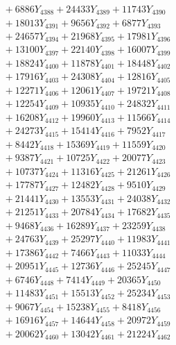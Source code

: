\documentclass[a4paper,10pt]{article}
\begin{document}
{\begin{align}
&\;  + 6886 Y_{4388} + 24433 Y_{4389} + 11743 Y_{4390} \\[0.3ex]
&\;  + 18013 Y_{4391} + 9656 Y_{4392} + 6877 Y_{4393} \\[0.3ex]
&\;  + 24657 Y_{4394} + 21968 Y_{4395} + 17981 Y_{4396} \\[0.3ex]
&\;  + 13100 Y_{4397} + 22140 Y_{4398} + 16007 Y_{4399} \\[0.3ex]
&\;  + 18824 Y_{4400} + 11878 Y_{4401} + 18448 Y_{4402} \\[0.3ex]
&\;  + 17916 Y_{4403} + 24308 Y_{4404} + 12816 Y_{4405} \\[0.3ex]
&\;  + 12271 Y_{4406} + 12061 Y_{4407} + 19721 Y_{4408} \\[0.5ex]\allowbreak
&\;  + 12254 Y_{4409} + 10935 Y_{4410} + 24832 Y_{4411} \\[0.3ex]
&\;  + 16208 Y_{4412} + 19960 Y_{4413} + 11566 Y_{4414} \\[0.3ex]
&\;  + 24273 Y_{4415} + 15414 Y_{4416} + 7952 Y_{4417} \\[0.3ex]
&\;  + 8442 Y_{4418} + 15369 Y_{4419} + 11559 Y_{4420} \\[0.3ex]
&\;  + 9387 Y_{4421} + 10725 Y_{4422} + 20077 Y_{4423} \\[0.3ex]
&\;  + 10737 Y_{4424} + 11316 Y_{4425} + 21261 Y_{4426} \\[0.3ex]
&\;  + 17787 Y_{4427} + 12482 Y_{4428} + 9510 Y_{4429} \\[0.3ex]
&\;  + 21441 Y_{4430} + 13553 Y_{4431} + 24038 Y_{4432} \\[0.3ex]
&\;  + 21251 Y_{4433} + 20784 Y_{4434} + 17682 Y_{4435} \\[0.3ex]
&\;  + 9468 Y_{4436} + 16289 Y_{4437} + 23259 Y_{4438} \\[0.5ex]\allowbreak
&\;  + 24763 Y_{4439} + 25297 Y_{4440} + 11983 Y_{4441} \\[0.3ex]
&\;  + 17386 Y_{4442} + 7466 Y_{4443} + 11033 Y_{4444} \\[0.3ex]
&\;  + 20951 Y_{4445} + 12736 Y_{4446} + 25245 Y_{4447} \\[0.3ex]
&\;  + 6746 Y_{4448} + 7414 Y_{4449} + 20365 Y_{4450} \\[0.3ex]
&\;  + 11483 Y_{4451} + 15513 Y_{4452} + 25234 Y_{4453} \\[0.3ex]
&\;  + 9067 Y_{4454} + 15238 Y_{4455} + 8418 Y_{4456} \\[0.3ex]
&\;  + 16916 Y_{4457} + 14644 Y_{4458} + 20972 Y_{4459} \\[0.3ex]
&\;  + 20062 Y_{4460} + 13042 Y_{4461} + 21224 Y_{4462} \\[0.3ex]

\end{align}}
\end{document}
